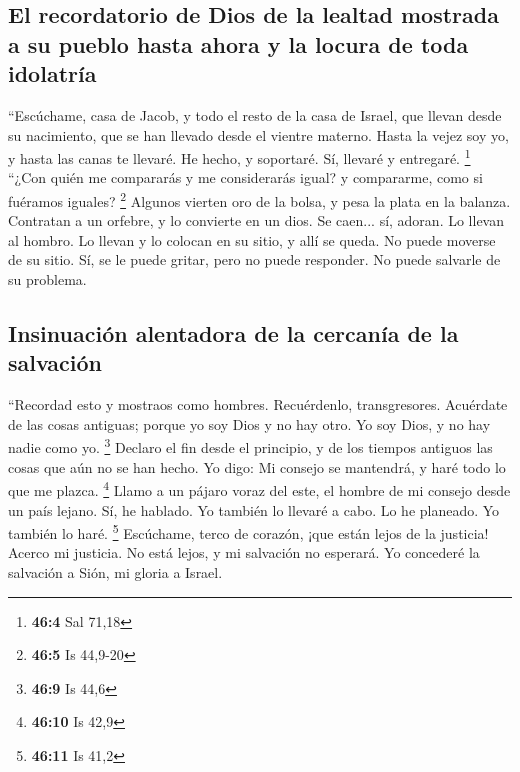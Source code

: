 \hypertarget{el-recordatorio-de-dios-de-la-lealtad-mostrada-a-su-pueblo-hasta-ahora-y-la-locura-de-toda-idolatruxeda}{%
\subsection{El recordatorio de Dios de la lealtad mostrada a su pueblo
hasta ahora y la locura de toda
idolatría}\label{el-recordatorio-de-dios-de-la-lealtad-mostrada-a-su-pueblo-hasta-ahora-y-la-locura-de-toda-idolatruxeda}}

 ``Escúchame, casa de Jacob, y todo el resto de la casa de
Israel, que llevan desde su nacimiento, que se han llevado desde el
vientre materno.  Hasta la vejez soy yo, y hasta las canas
te llevaré. He hecho, y soportaré. Sí, llevaré y entregaré. \footnote{\textbf{46:4}
  Sal 71,18}  ``¿Con quién me compararás y me considerarás
igual? y compararme, como si fuéramos iguales? \footnote{\textbf{46:5}
  Is 44,9-20}  Algunos vierten oro de la bolsa, y pesa la
plata en la balanza. Contratan a un orfebre, y lo convierte en un dios.
Se caen... sí, adoran.  Lo llevan al hombro. Lo llevan y
lo colocan en su sitio, y allí se queda. No puede moverse de su sitio.
Sí, se le puede gritar, pero no puede responder. No puede salvarle de su
problema.

\hypertarget{insinuaciuxf3n-alentadora-de-la-cercanuxeda-de-la-salvaciuxf3n}{%
\subsection{Insinuación alentadora de la cercanía de la
salvación}\label{insinuaciuxf3n-alentadora-de-la-cercanuxeda-de-la-salvaciuxf3n}}

 ``Recordad esto y mostraos como hombres. Recuérdenlo,
transgresores.  Acuérdate de las cosas antiguas; porque yo
soy Dios y no hay otro. Yo soy Dios, y no hay nadie como yo. \footnote{\textbf{46:9}
  Is 44,6}  Declaro el fin desde el principio, y de los
tiempos antiguos las cosas que aún no se han hecho. Yo digo: Mi consejo
se mantendrá, y haré todo lo que me plazca. \footnote{\textbf{46:10} Is
  42,9}  Llamo a un pájaro voraz del este, el hombre de
mi consejo desde un país lejano. Sí, he hablado. Yo también lo llevaré a
cabo. Lo he planeado. Yo también lo haré. \footnote{\textbf{46:11} Is
  41,2}  Escúchame, terco de corazón, ¡que están lejos de
la justicia!  Acerco mi justicia. No está lejos, y mi
salvación no esperará. Yo concederé la salvación a Sión, mi gloria a
Israel.

